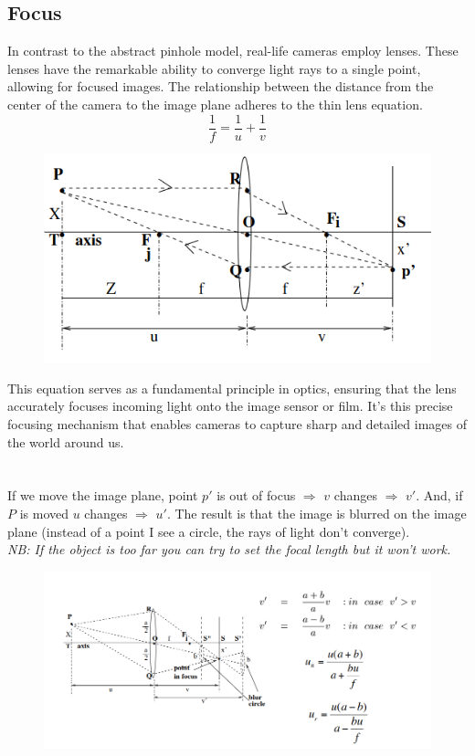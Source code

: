 \subsection{Focus}
In contrast to the abstract pinhole model, real-life cameras employ lenses. These lenses have the remarkable ability to converge light rays to a single point, allowing for focused images. 
The relationship between the distance from the center of the camera to the image plane adheres to the thin lens equation.
\[
    \frac{1}{f} = \frac{1}{u} + \frac{1}{v}
\]
\begin{figure}
    \includegraphics[scale=0.4]{Figures/ThinLenses.png}
\end{figure}
This equation serves as a fundamental principle in optics, ensuring that the lens accurately focuses incoming light onto the image sensor or film. 
It's this precise focusing mechanism that enables cameras to capture sharp and detailed images of the world around us.\\
\\\\
If we move the image plane, point $p'$ is out of focus $\Rightarrow$ $v$ changes $\Rightarrow$ $v'$. And, if $P$ is moved $u$ changes $\Rightarrow$ $u'$.
The result is that the image is blurred on the image plane (instead of a point I see a circle, the rays of light don't converge).
\\\textit{NB: If the object is too far you can try to set the focal length but it won't work.}
\begin{figure}[h]
    \centering
    \includegraphics[width=1\textwidth]{Figures/Focus.png}
\end{figure}
